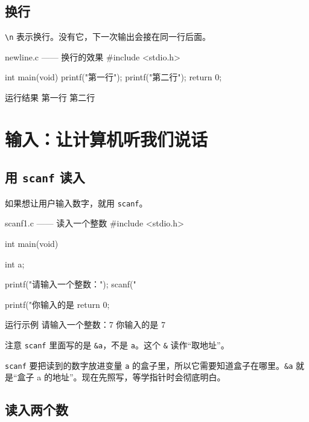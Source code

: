\subsection{换行}

\texttt{\textbackslash n} 表示换行。没有它，下一次输出会接在同一行后面。

\begin{codebox}{newline.c —— 换行的效果}
#include <stdio.h>

int main(void)
{
    printf("第一行\n");
    printf("第二行\n");
    return 0;
}
\end{codebox}

\begin{outbox}{运行结果}
第一行
第二行
\end{outbox}

\section{输入：让计算机听我们说话}

\subsection{用 \texttt{scanf} 读入}

如果想让用户输入数字，就用 \texttt{scanf}。

\begin{codebox}{scanf1.c —— 读入一个整数}
#include <stdio.h>

int main(void)
{
    int a;

    printf("请输入一个整数：");
    scanf("%

    printf("你输入的是 %
    return 0;
}
\end{codebox}

\begin{outbox}{运行示例}
请输入一个整数：7
你输入的是 7
\end{outbox}

注意 \texttt{scanf} 里面写的是 \texttt{\&a}，不是 \texttt{a}。这个 \texttt{\&} 读作“取地址”。

\begin{tipbox}
\texttt{scanf} 要把读到的数字放进变量 \texttt{a} 的盒子里，所以它需要知道盒子在哪里。\texttt{\&a} 就是“盒子 a 的地址”。现在先照写，等学指针时会彻底明白。
\end{tipbox}

\subsection{读入两个数}

